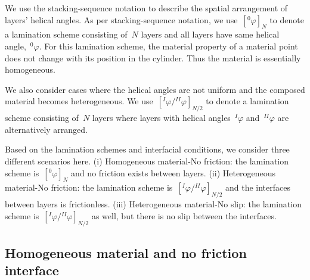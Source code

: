 \documentclass[preprint,12pt,times]{elsarticle}
\numberwithin{equation}{section}
\renewcommand{\>}{$\Rightarrow$}
\begin{document}
We use the stacking-sequence notation to describe the spatial arrangement of layers' helical angles. As per stacking-sequence notation, we use~$[{}^{0}\!\varphi]_N$ to denote a lamination scheme consisting of~$N$ layers and all layers have same helical angle,~${}^{0}\!\varphi$.
For this lamination scheme, the material property of a material point does not change with its position in the cylinder. Thus the material is essentially homogeneous.


We also consider cases where the helical angles are not uniform and the composed material becomes heterogeneous. We use~$[{}^{I}\!\varphi/{}^{II}\!\varphi]_{N/2}$ to denote a lamination scheme consisting of~$N$ layers where layers with helical angles~${}^{I}\!\varphi$ and~${}^{II}\!\varphi$ are alternatively arranged.

Based on the lamination schemes and interfacial conditions, we consider three different scenarios here. (i) Homogeneous material-No friction: the lamination scheme is~$[{}^{0}\!\varphi]_N$ and no friction exists between layers. (ii) Heterogeneous material-No friction: the lamination scheme is~$[{}^{I}\!\varphi/{}^{II}\!\varphi]_{N/2}$ and the interfaces between layers is frictionless. (iii) Heterogeneous material-No slip: the lamination scheme is~$[{}^{I}\!\varphi/{}^{II}\!\varphi]_{N/2}$ as well, but there is no slip between the interfaces.

\subsection{Homogeneous material and no friction interface}
\label{sec:1mat_no_friction}
\end{document}
